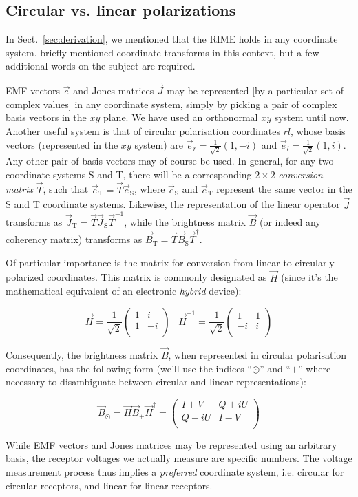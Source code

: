 \documentclass[]{aa}
\newcommand{\matrixtt}[4]{\left( \begin{array}{cc}#1&#2\\#3&#4\\\end{array} \right)}
\begin{document}
\subsection{\label{sec:circular}Circular vs. linear polarizations}

In Sect.~\ref{sec:derivation}, we mentioned that the RIME holds in any coordinate system. \citet{ME1} briefly mentioned coordinate transforms in this context, but a few additional words on the subject are required.

EMF vectors $\vec e$ and Jones matrices $\vec J$ may be represented [by a particular set of complex values] in any coordinate system, simply by picking a pair of complex basis vectors in the $xy$ plane. We have used an orthonormal $xy$ system until now. Another useful system is that of circular polarisation coordinates $rl$, whose basis vectors (represented in the $xy$ system) are $\vec e_r=\frac{1}{\sqrt{2}}(1,-i)$ and $\vec e_l=\frac{1}{\sqrt{2}}(1,i)$. Any other pair of basis vectors may of course be used. In general, for any two coordinate systems S and T, there will be a corresponding $2\times2$ {\em conversion matrix} $\vec T$, such that $\vec e_\mathrm{T}=\vec T \vec e_\mathrm{S}$, where $\vec e_\mathrm{S}$ and $\vec e_\mathrm{T}$ represent the same vector in the S and T coordinate systems. Likewise, the representation of the linear operator $\vec J$ transforms as $\vec J_\mathrm{T}=\vec T \vec J_\mathrm{S} \vec T^{-1}$, while the brightness matrix $\vec B$ (or indeed any coherency matrix) transforms as $\vec B_\mathrm{T}=\vec T \vec B_\mathrm{S} \vec T^\dagger.$

Of particular importance is the matrix for conversion from linear to circularly polarized coordinates. This matrix is commonly designated as $\vec H$ (since it's the mathematical equivalent of an electronic {\em hybrid} device):

\[
\vec H = \frac{1}{\sqrt{2}} \matrixtt{1}{i}{1}{-i} \;\;\; \vec H^{-1} = \frac{1}{\sqrt{2}} \matrixtt{1}{1}{-i}{i}
\]

Consequently, the brightness matrix $\vec B$, when represented in circular polarisation coordinates, has the following form (we'll use the indices ``$\odot$'' and ``$+$'' where necessary to disambiguate between circular and linear representations):

\[
\vec B_{\odot} = \vec H \vec B_{+} \vec H^\dagger = \matrixtt{I+V}{Q+iU}{Q-iU}{I-V}
\]

While EMF vectors and Jones matrices may be represented using an arbitrary basis, the receptor voltages we actually measure are specific numbers. The voltage measurement process thus implies a {\em preferred} coordinate system, i.e. circular for circular receptors, and linear for linear receptors. 
\end{document}
